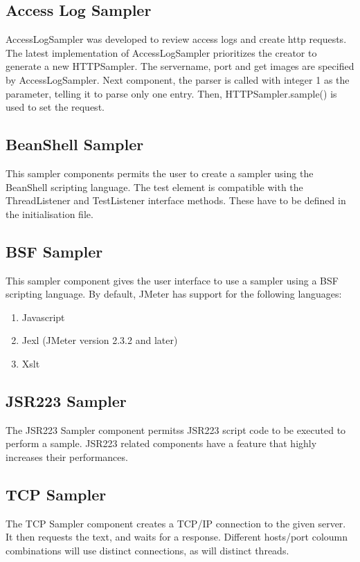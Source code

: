 \documentclass[12pt]{book}
\begin{document}
  
  \subsection{Access Log Sampler}
  AccessLogSampler was developed to review access logs and create http requests. The latest implementation of AccessLogSampler prioritizes the
  creator to generate a new HTTPSampler. The servername, port and get images are specified by AccessLogSampler. Next component, the parser is 
  called with integer 1 as the parameter, telling it to parse only one entry. Then, HTTPSampler.sample() is used to set the request.
  
  \subsection{BeanShell Sampler}
  This sampler components permits the user to create a sampler using the BeanShell scripting language. The test element is compatible with the 
  ThreadListener and TestListener interface methods. These have to be defined in the initialisation file.
  
  \subsection{BSF Sampler}
  This sampler component gives the user interface to use a sampler using a BSF scripting language. By default, JMeter has support for the 
  following languages:
  \begin{enumerate}
   \item Javascript
   \item Jexl (JMeter version 2.3.2 and later)
   \item Xslt
  \end{enumerate}

  
  \subsection{JSR223 Sampler}
  The JSR223 Sampler component permitss JSR223 script code to be executed to perform a sample. JSR223 related components have a feature that highly 
  increases their performances.
  
  \subsection{TCP Sampler}
  The TCP Sampler component creates a TCP/IP connection to the given server. It then requests the text, and waits for a response. 
  Different hosts/port coloumn combinations will use distinct connections, as will distinct threads.
  
\end{document}
